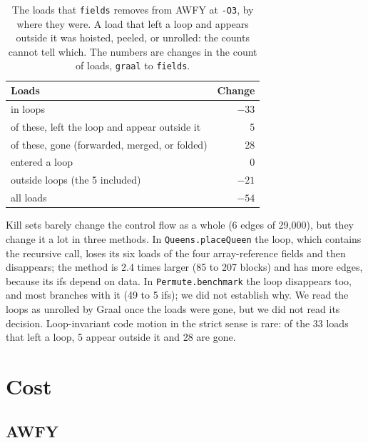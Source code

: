 \begin{table}[t]
    \centering
    \caption{The loads that \texttt{fields} removes from AWFY at \texttt{-O3}, by where they were. A load that left a loop and
    appears outside it was hoisted, peeled, or unrolled: the counts cannot tell which. The numbers are changes in the count of
    loads, \texttt{graal} to \texttt{fields}.}
    \label{tab:eval-loops}
    \footnotesize
    \begin{tabular}{lr}
        \toprule
        Loads & Change \\
        \midrule
        in loops                                               & $-33$ \\
        \quad of these, left the loop and appear outside it    & 5 \\
        \quad of these, gone (forwarded, merged, or folded)    & 28 \\
        \quad entered a loop                                   & 0 \\
        outside loops (the 5 included)                         & $-21$ \\
        \midrule
        all loads                                              & $-54$ \\
        \bottomrule
    \end{tabular}
\end{table}

Kill sets barely change the control flow as a whole (6 edges of 29,000), but they change it a lot in three methods. In
\texttt{Queens.placeQueen} the loop, which contains the recursive call, loses its six loads of the four array-reference fields
and then disappears; the method is 2.4 times larger (85 to 207 blocks) and has more edges, because its ifs depend on data. In
\texttt{Permute.benchmark} the loop disappears too, and most branches with it (49 to 5 ifs); we did not establish why. We read the
loops as unrolled by Graal once the loads were gone, but we did not read its decision. Loop-invariant code motion in the strict
sense is rare: of the 33 loads that left a loop, 5 appear outside it and 28 are gone.

\section{Cost}\label{sec:eval-cost}

\subsection{AWFY}\label{sec:eval-cost-awfy}

